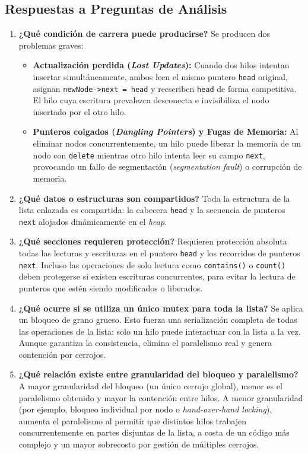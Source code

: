 \documentclass[11pt,a4paper]{article}
\begin{document}
\subsection{Respuestas a Preguntas de Análisis}
\begin{enumerate}
    \item \textbf{¿Qué condición de carrera puede producirse?}
    Se producen dos problemas graves:
    \begin{itemize}
        \item \textbf{Actualización perdida (\textit{Lost Updates}):} Cuando dos hilos intentan insertar simultáneamente, ambos leen el mismo puntero \texttt{head} original, asignan \texttt{newNode->next = head} y reescriben \texttt{head} de forma competitiva. El hilo cuya escritura prevalezca desconecta e invisibiliza el nodo insertado por el otro hilo.
        \item \textbf{Punteros colgados (\textit{Dangling Pointers}) y Fugas de Memoria:} Al eliminar nodos concurrentemente, un hilo puede liberar la memoria de un nodo con \texttt{delete} mientras otro hilo intenta leer su campo \texttt{next}, provocando un fallo de segmentación (\textit{segmentation fault}) o corrupción de memoria.
    \end{itemize}

    \item \textbf{¿Qué datos o estructuras son compartidos?}
    Toda la estructura de la lista enlazada es compartida: la cabecera \texttt{head} y la secuencia de punteros \texttt{next} alojados dinámicamente en el \textit{heap}.

    \item \textbf{¿Qué secciones requieren protección?}
    Requieren protección absoluta todas las lecturas y escrituras en el puntero \texttt{head} y los recorridos de punteros \texttt{next}. Incluso las operaciones de solo lectura como \texttt{contains()} o \texttt{count()} deben protegerse si existen escrituras concurrentes, para evitar la lectura de punteros que estén siendo modificados o liberados.

    \item \textbf{¿Qué ocurre si se utiliza un único mutex para toda la lista?}
    Se aplica un bloqueo de grano grueso. Esto fuerza una serialización completa de todas las operaciones de la lista: solo un hilo puede interactuar con la lista a la vez. Aunque garantiza la consistencia, elimina el paralelismo real y genera contención por cerrojos.

    \item \textbf{¿Qué relación existe entre granularidad del bloqueo y paralelismo?}
    A mayor granularidad del bloqueo (un único cerrojo global), menor es el paralelismo obtenido y mayor la contención entre hilos. A menor granularidad (por ejemplo, bloqueo individual por nodo o \textit{hand-over-hand locking}), aumenta el paralelismo al permitir que distintos hilos trabajen concurrentemente en partes disjuntas de la lista, a costa de un código más complejo y un mayor sobrecosto por gestión de múltiples cerrojos.


\end{enumerate}
\end{document}
